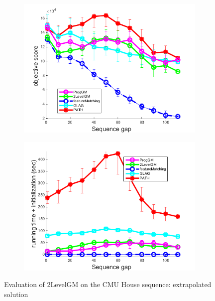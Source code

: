\documentclass[hyperref={pdfpagelabels=false}]{beamer}
\begin{document}
\begin{frame}
\begin{minipage}[0.2\textheight]{\textwidth}
\begin{columns}[T]
\begin{column}{0.7\textwidth}
\begin{figure}[h]
\begin{subfigure}[b]{0.32\textwidth}
					\end{subfigure} 
					\begin{subfigure}[b]{0.32\textwidth}
						\centering
						\includegraphics[scale=0.12]{"fig/evaluation/HouseSeq2/anchor_descr/using_cpd_afftrafo/ext_solution2/performance/score"} 
					\end{subfigure}
					\begin{subfigure}[b]{0.32\textwidth}
						\centering
						\includegraphics[scale=0.12]{"fig/evaluation/HouseSeq2/anchor_descr/using_cpd_afftrafo/ext_solution2/performance/time_summary"}
					\end{subfigure} 	
				\caption*{Evaluation of 2LevelGM on the CMU House sequence: extrapolated solution}
			\end{figure}


\end{column}
\end{columns}
\end{minipage}
\end{frame}
\end{document}
